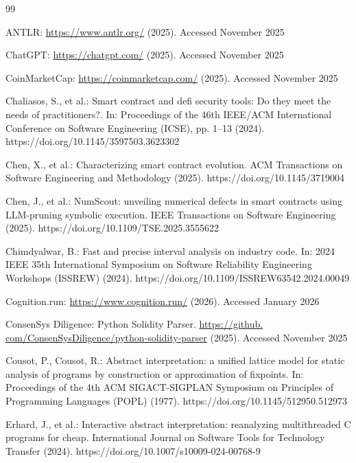 \documentclass[pdflatex,sn-basic]{sn-jnl}%
\theoremstyle{thmstyleone}%
\theoremstyle{thmstyletwo}%
\theoremstyle{thmstylethree}%
\begin{document}
\begin{thebibliography}{99}

ANTLR: \url{https://www.antlr.org/} (2025). Accessed November 2025

ChatGPT: \url{https://chatgpt.com/} (2025). Accessed November 2025

CoinMarketCap: \url{https://coinmarketcap.com/} (2025). Accessed November 2025

Chaliasos, S., et al.: Smart contract and defi security tools: Do they meet the needs of practitioners?. In: Proceedings of the 46th IEEE/ACM International Conference on Software Engineering (ICSE), pp. 1--13 (2024). https://doi.org/10.1145/3597503.3623302

Chen, X., et al.: Characterizing smart contract evolution. ACM Transactions on Software Engineering and Methodology (2025). https://doi.org/10.1145/3719004

Chen, J., et al.: NumScout: unveiling numerical defects in smart contracts using LLM-pruning symbolic execution. IEEE Transactions on Software Engineering (2025). https://doi.org/10.1109/TSE.2025.3555622

Chimdyalwar, B.: Fast and precise interval analysis on industry code. In: 2024 IEEE 35th
International Symposium on Software Reliability Engineering Workshops (ISSREW) (2024). https://doi.org/10.1109/ISSREW63542.2024.00049

Cognition.run: \url{https://www.cognition.run/} (2026). Accessed January 2026

ConsenSys Diligence: Python Solidity Parser. \url{https://github.
com/ConsenSysDiligence/python-solidity-parser} (2025). Accessed November 2025

Cousot, P., Cousot, R.: Abstract interpretation: a unified lattice model for static analysis of
programs by construction or approximation of fixpoints. In: Proceedings of the 4th ACM
SIGACT-SIGPLAN Symposium on Principles of Programming Languages (POPL) (1977). https://doi.org/10.1145/512950.512973

Erhard, J., et al.: Interactive abstract interpretation: reanalyzing multithreaded C programs for
cheap. International Journal on Software Tools for Technology Transfer (2024). https://doi.org/10.1007/s10009-024-00768-9


\end{thebibliography}
\end{document}
